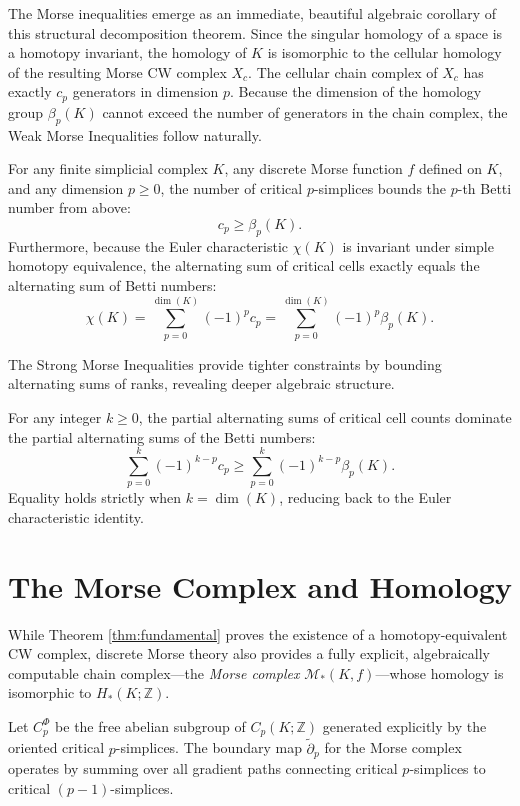 The Morse inequalities emerge as an immediate, beautiful algebraic corollary of this structural decomposition theorem. Since the singular homology of a space is a homotopy invariant, the homology of $K$ is isomorphic to the cellular homology of the resulting Morse CW complex $X_c$. The cellular chain complex of $X_c$ has exactly $c_p$ generators in dimension $p$. Because the dimension of the homology group $\beta_p(K)$ cannot exceed the number of generators in the chain complex, the Weak Morse Inequalities follow naturally.

\begin{theorem}
\label{thm:weak_morse}
For any finite simplicial complex $K$, any discrete Morse function $f$ defined on $K$, and any dimension $p \ge 0$, the number of critical $p$-simplices bounds the $p$-th Betti number from above:
\[ c_p \ge \beta_p(K). \]
Furthermore, because the Euler characteristic $\chi(K)$ is invariant under simple homotopy equivalence, the alternating sum of critical cells exactly equals the alternating sum of Betti numbers:
\[ \chi(K) = \sum_{p=0}^{\dim(K)} (-1)^p c_p = \sum_{p=0}^{\dim(K)} (-1)^p \beta_p(K). \]
\end{theorem}

The Strong Morse Inequalities provide tighter constraints by bounding alternating sums of ranks, revealing deeper algebraic structure.

\begin{theorem}
\label{thm:strong_morse}
For any integer $k \ge 0$, the partial alternating sums of critical cell counts dominate the partial alternating sums of the Betti numbers:
\[ \sum_{p=0}^k (-1)^{k-p} c_p \ge \sum_{p=0}^k (-1)^{k-p} \beta_p(K). \]
Equality holds strictly when $k = \dim(K)$, reducing back to the Euler characteristic identity.
\end{theorem}

\section{The Morse Complex and Homology}

While Theorem \ref{thm:fundamental} proves the existence of a homotopy-equivalent CW complex, discrete Morse theory also provides a fully explicit, algebraically computable chain complex—the \emph{Morse complex} $\mathcal{M}_*(K, f)$—whose homology is isomorphic to $H_*(K; \mathbb{Z})$.

Let $C_p^\Phi$ be the free abelian subgroup of $C_p(K; \mathbb{Z})$ generated explicitly by the oriented critical $p$-simplices. The boundary map $\tilde{\partial}_p$ for the Morse complex operates by summing over all gradient paths connecting critical $p$-simplices to critical $(p-1)$-simplices.


